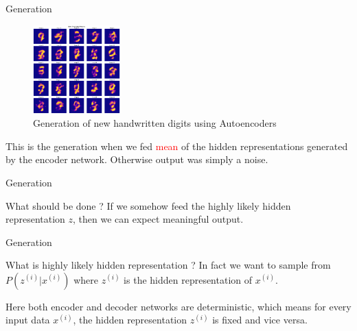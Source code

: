 \begin{frame}{Generation}
    \begin{figure}
        \centering
        \includegraphics[width=0.3\textwidth]{../ReportNeurips/mnistGenerated2.png}
        \caption{Generation of new handwritten digits using Autoencoders}
    \end{figure}
    \pause
    This is the generation when we fed \textcolor{red}{mean} of the hidden representations generated by the encoder network. Otherwise output was simply a noise.
\end{frame}

\begin{frame}{Generation}
    \begin{block}{What should be done ?}
        If we somehow feed the highly likely hidden representation $z$, then we can expect meaningful output.
    \end{block}
\end{frame}

\begin{frame}{Generation}
    \begin{block}{What is highly likely hidden representation ?}
        In fact we want to sample from $P(z^{(i)}|x^{(i)})$ where $z^{(i)}$ is the hidden representation of $x^{(i)}$.
    \end{block}
    Here both encoder and decoder networks are deterministic, which means for every input data $x^{(i)}$, the hidden representation $z^{(i)}$ is fixed and vice versa.
\end{frame}